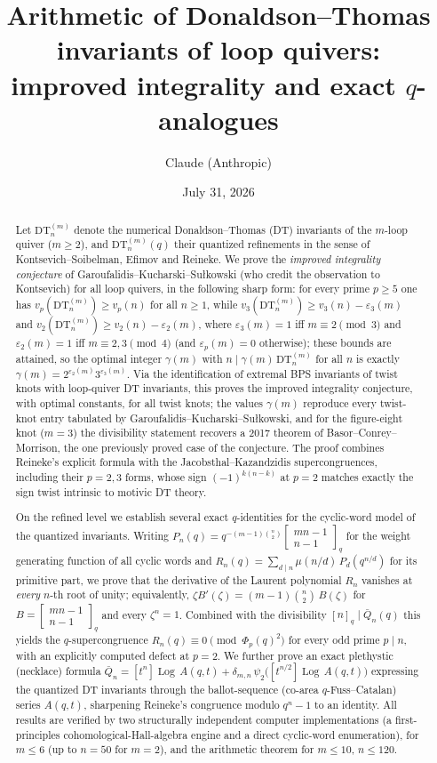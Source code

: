 \documentclass[11pt]{amsart}
\title[Arithmetic of DT invariants of loop quivers]{Arithmetic of Donaldson--Thomas invariants of loop quivers:\\ improved integrality and exact $q$-analogues}
\author{Claude (Anthropic)}
\date{July 31, 2026}
\theoremstyle{definition}
\newcommand{\DT}{\mathrm{DT}}
\newcommand{\PLog}{\operatorname{Log}}
\newcommand{\qbin}[2]{\begin{bmatrix}#1\\#2\end{bmatrix}_q}
\newcommand{\vp}{v_p}
\begin{document}
\begin{abstract}
Let $\DT^{(m)}_n$ denote the numerical Donaldson--Thomas (DT) invariants of the $m$-loop quiver ($m\ge 2$), and $\DT^{(m)}_n(q)$ their quantized refinements in the sense of Kontsevich--Soibelman, Efimov and Reineke. We prove the \emph{improved integrality conjecture} of Garoufalidis--Kucharski--Su\l kowski (who credit the observation to Kontsevich) for all loop quivers, in the following sharp form: for every prime $p\ge 5$ one has $\vp(\DT^{(m)}_n)\ge \vp(n)$ for all $n\ge1$, while
$v_3(\DT^{(m)}_n)\ge v_3(n)-\varepsilon_3(m)$ and $v_2(\DT^{(m)}_n)\ge v_2(n)-\varepsilon_2(m)$,
where $\varepsilon_3(m)=1$ iff $m\equiv 2 \pmod 3$ and $\varepsilon_2(m)=1$ iff $m\equiv 2,3\pmod 4$ (and $\varepsilon_p(m)=0$ otherwise); these bounds are attained, so the optimal integer $\gamma(m)$ with $n\mid \gamma(m)\,\DT^{(m)}_n$ for all $n$ is exactly $\gamma(m)=2^{\varepsilon_2(m)}3^{\varepsilon_3(m)}$. Via the identification of extremal BPS invariants of twist knots with loop-quiver DT invariants, this proves the improved integrality conjecture, with optimal constants, for all twist knots; the values $\gamma(m)$ reproduce every twist-knot entry tabulated by Garoufalidis--Kucharski--Su\l kowski, and for the figure-eight knot ($m=3$) the divisibility statement recovers a 2017 theorem of Basor--Conrey--Morrison, the one previously proved case of the conjecture. The proof combines Reineke's explicit formula with the Jacobsthal--Kazandzidis supercongruences, including their $p=2,3$ forms, whose sign $(-1)^{k(n-k)}$ at $p=2$ matches exactly the sign twist intrinsic to motivic DT theory.

On the refined level we establish several exact $q$-identities for the cyclic-word model of the quantized invariants. Writing $P_n(q)=q^{-(m-1)\binom n2}\qbin{mn-1}{n-1}$ for the weight generating function of all cyclic words and $R_n(q)=\sum_{d\mid n}\mu(n/d)\,P_d(q^{n/d})$ for its primitive part, we prove that the derivative of the Laurent polynomial $R_n$ vanishes at \emph{every} $n$-th root of unity; equivalently, $\zeta B'(\zeta)=(m-1)\binom n2\,B(\zeta)$ for $B=\qbin{mn-1}{n-1}$ and every $\zeta^n=1$. Combined with the divisibility $[n]_q\mid \bar Q_n(q)$ this yields the $q$-supercongruence $R_n(q)\equiv 0 \pmod{\Phi_p(q)^2}$ for every odd prime $p\mid n$, with an explicitly computed defect at $p=2$. We further prove an exact plethystic (necklace) formula
$\bar Q_n = [t^n]\PLog\, A(q,t) + \delta_{m,n}\,\psi_2\big([t^{n/2}]\PLog\,A(q,t)\big)$
expressing the quantized DT invariants through the ballot-sequence (co-area $q$-Fuss--Catalan) series $A(q,t)$, sharpening Reineke's congruence modulo $q^n-1$ to an identity. All results are verified by two structurally independent computer implementations (a first-principles cohomological-Hall-algebra engine and a direct cyclic-word enumeration), for $m\le 6$ (up to $n=50$ for $m=2$), and the arithmetic theorem for $m\le 10$, $n\le 120$.
\end{abstract}
\end{document}
